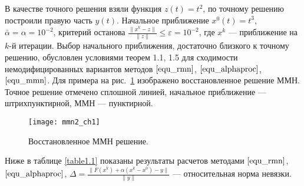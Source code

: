  В качестве точного решения взяли функция $z(t)=t^2$, по точному решению построили правую часть $y(t)$.  Начальное приближение $x^0(t)=t^3$, $\bar\alpha=\alpha=10^{-2}$, критерий останова $\frac{\|x^k-z\|}{\|z\|}\le\varepsilon=10^{-2}$, где $x^k$ --- приближение на $k$-й итерации. Выбор начального приближения, достаточно близкого к точному решению, обусловлен условиями теорем 1.1, 1.5 для сходимости немодифицированных вариантов методов $\eqref{equ_rmn}$, $\eqref{equ_alphaproc}$, $\eqref{equ_mmn}$. Для примера на рис.~\ref{fig:mmn_ch1} изображено восстановленное решение ММН. Точное решение отмечено сплошной линией, начальное приближение --- штрихпунктирной, ММН --- пунктирной. 
\begin{figure}[h]
	\centering
	\texttt{[image: mmn2\_ch1]}
	\caption{Восстановленное ММН решение.}
	\label{fig:mmn_ch1}
\end{figure}
Ниже в таблице \ref{table1.1} показаны результаты расчетов методами $\eqref{equ_rmn}$, $\eqref{equ_alphaproc}$, $\Delta=\frac{\|F(x^k)+\alpha(x^k-x^0)-y\|}{\|y\|}$ --- относительная норма невязки. 
